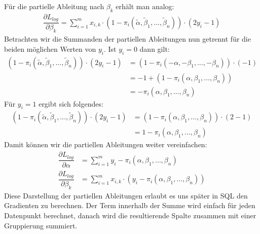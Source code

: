 Für die partielle Ableitung nach $\beta_k$ erhält man analog:
\begin{align*}
    \dfrac{\partial L_{log}}{\partial \beta_k} = \sum_{i=1}^m x_{i, k} \cdot (1 - \pi_i(\tilde\alpha, \tilde\beta_1, \dots, \tilde\beta_n)) \cdot (2 y_i - 1)
\end{align*}
Betrachten wir die Summanden der partiellen Ableitungen nun getrennt für die beiden möglichen Werten von $y_i$. Ist $y_i = 0$ dann gilt:
\begin{align*}
    (1 - \pi_i(\tilde\alpha, \tilde\beta_1, \dots, \tilde\beta_n)) \cdot (2 y_i - 1) &= (1 - \pi_i(- \alpha, - \beta_1, \dots, - \beta_n)) \cdot (- 1) \\
    &= - 1 + (1 - \pi_i(\alpha, \beta_1, \dots, \beta_n)) \\
    &= - \pi_i(\alpha, \beta_1, \dots, \beta_n)
\end{align*}
Für $y_i = 1$ ergibt sich folgendes:
\begin{align*}
    (1 - \pi_i(\tilde\alpha, \tilde\beta_1, \dots, \tilde\beta_n)) \cdot (2 y_i - 1) &= (1 - \pi_i(\alpha, \beta_1, \dots, \beta_n)) \cdot (2 - 1) \\
    &= 1 - \pi_i(\alpha, \beta_1, \dots, \beta_n)
\end{align*}
Damit können wir die partiellen Ableitungen weiter vereinfachen:
\begin{align*}
    \dfrac{\partial L_{log}}{\partial \alpha} &= \sum_{i=1}^m y_i - \pi_i(\alpha, \beta_1, \dots, \beta_n) \\
    \dfrac{\partial L_{log}}{\partial \beta_k} &= \sum_{i=1}^m x_{i, k} \cdot (y_i - \pi_i(\alpha, \beta_1, \dots, \beta_n))
\end{align*}
Diese Darstellung der partiellen Ableitungen erlaubt es uns später in SQL den Gradienten zu berechnen. Der Term innerhalb der Summe wird einfach für jeden Datenpunkt berechnet, danach wird die resultierende Spalte zusammen mit einer Gruppierung summiert.
